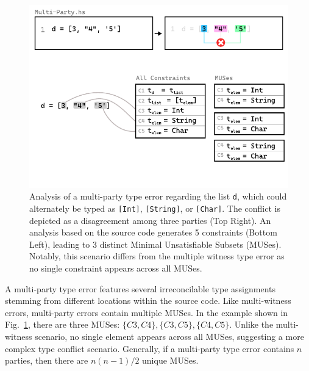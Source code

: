 \documentclass[pdflatex,sn-mathphys-num]{sn-jnl}%
\begin{document}
\begin{figure}[hbt]
  \centering
  \includegraphics[width=\linewidth]{images/Multi-Party-MUS}
  \caption{\label{fig:multi-party-2} Analysis of a multi-party type error regarding the list \texttt{d}, which could alternately be typed as \texttt{[Int]}, \texttt{[String]}, or \texttt{[Char]}. The conflict is depicted as a disagreement among three parties (Top Right). An analysis based on the source code generates 5 constraints (Bottom Left), leading to 3 distinct Minimal Unsatisfiable Subsets (MUSes). Notably, this scenario differs from the multiple witness type error as no single constraint appears across all MUSes.}
  \end{figure}

  A multi-party type error features several irreconcilable type assignments stemming from different locations within the source code. Like multi-witness errors, multi-party errors contain multiple MUSes. In the example shown in Fig.~\ref{fig:multi-party-2}, there are three MUSes: $\{C3, C4\}, \{C3, C5\}, \{C4, C5\}$. Unlike the multi-witness scenario, no single element appears across all MUSes, suggesting a more complex type conflict scenario. Generally, if a multi-party type error contains $n$ parties, then there are $n (n - 1) / 2$ unique MUSes.

  

\end{document}

